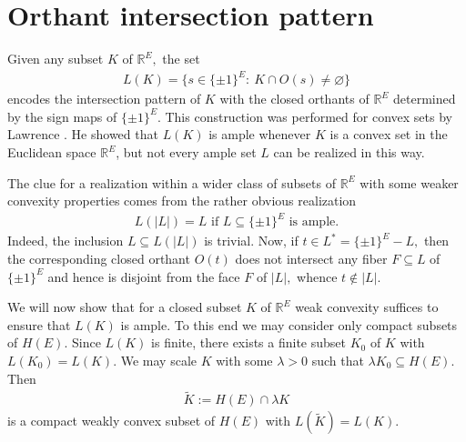 \documentclass[11pt,a4paper]{amsart}
\theoremstyle{definition}
\numberwithin{equation}{section}
\newcommand{\covectors}{\ensuremath{L}}
\newcommand{\HH}{\ensuremath{H}}
\newcommand{\FF}{\ensuremath{F}}
\newcommand{\OO}{\ensuremath{{O}}}
\begin{document}
\section{Orthant intersection pattern}\label{realization}

Given any
subset $K$ of ${\mathbb R}^E,$ the set
\begin{align*}
L(K)=\{ s\in \{ \pm 1\}^E: ~K\cap \OO(s)\ne\varnothing\}
\end{align*}
encodes the intersection pattern of $K$ with the closed orthants of ${\mathbb R}^E$
determined by the sign maps of $\{ \pm 1\}^E$.
This construction was performed for convex sets by Lawrence \cite{La}. He showed that $L(K)$ is ample whenever $K$ is  a convex set
in the Euclidean space ${\mathbb R}^E$, but not every ample set $\covectors$ can be realized in this way.

The clue for a realization within a wider class
of subsets of ${\mathbb R}^E$ with some weaker convexity properties comes from the rather obvious realization
\begin{align*}
L(|\covectors|)=\covectors \mbox{ if } \covectors\subseteq \{ \pm 1\}^E \mbox{ is ample}. \tag{5}
\end{align*}
Indeed, the inclusion $\covectors\subseteq L(|\covectors|)$ is trivial. Now, if $t\in {\covectors}^*=\{ \pm 1\}^E-\covectors,$ then the corresponding
closed orthant $\OO(t)$ does not intersect any fiber $\FF\subseteq \covectors$ of $\{ \pm 1\}^E$ and hence is disjoint from the face ${\FF}$ of $|\covectors|,$
whence $t\notin |\covectors|.$

We will now show that for a closed subset $K$ of ${\mathbb R}^E$ weak convexity suffices to ensure that $L(K)$ is ample. To
this end we may consider only compact subsets of $H(E)$. Since $L(K)$ is finite, there exists a finite subset $K_0$ of
$K$ with $L(K_0)=L(K).$ We may scale $K$ with some $\lambda>0$ such that $\lambda K_0\subseteq \HH(E).$ Then
\begin{align*}
\widetilde{K}:=\HH(E)\cap \lambda K
\end{align*}
is a compact weakly convex subset of  $\HH(E)$ with $L(\widetilde{K})=L(K).$
\end{document}
